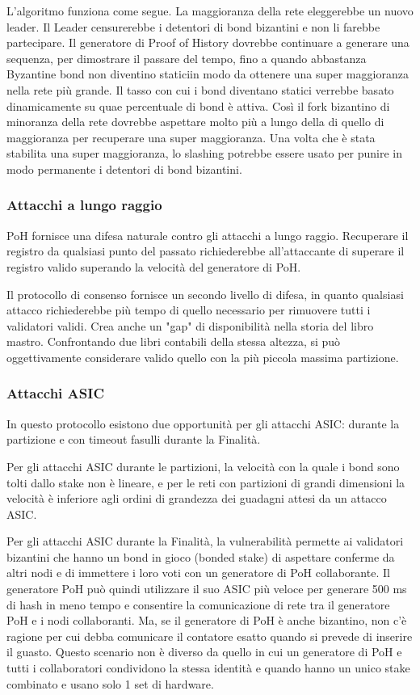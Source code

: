 \documentclass[12pt]{article}
\begin{document}
L'algoritmo funziona come segue. La maggioranza della rete eleggerebbe un nuovo leader. Il Leader censurerebbe i detentori di bond bizantini e non li farebbe partecipare. Il generatore di Proof of History dovrebbe continuare a generare una sequenza, per dimostrare il passare del tempo, fino a quando abbastanza Byzantine bond non diventino staticiin modo da ottenere una super maggioranza nella rete più grande. Il tasso con cui i bond diventano statici verrebbe basato dinamicamente su quae percentuale di bond è attiva. Così il fork bizantino di minoranza della rete dovrebbe aspettare molto più a lungo della di quello di maggioranza per recuperare una super maggioranza. Una volta che è stata stabilita una super maggioranza, lo slashing potrebbe essere usato per punire in modo permanente i detentori di bond bizantini.

\subsubsection{Attacchi a lungo raggio}\label{censorship}
PoH fornisce una difesa naturale contro gli attacchi a lungo raggio. Recuperare il registro da qualsiasi punto del passato richiederebbe all'attaccante di superare il registro valido superando la velocità del generatore di PoH.

Il protocollo di consenso fornisce un secondo livello di difesa, in quanto qualsiasi attacco richiederebbe più tempo di quello necessario per rimuovere tutti i validatori validi. Crea anche un "gap" di disponibilità nella storia del libro mastro. Confrontando due libri contabili della stessa altezza, si può oggettivamente considerare valido quello con la più piccola massima partizione.

\subsubsection{Attacchi ASIC}\label{censorship}

In questo protocollo esistono due opportunità per gli attacchi ASIC: durante la partizione e con timeout fasulli durante la Finalità.

Per gli attacchi ASIC durante le partizioni, la velocità con la quale i bond sono tolti dallo stake non è lineare, e per le reti con partizioni di grandi dimensioni la velocità è inferiore agli ordini di grandezza dei guadagni attesi da un attacco ASIC.

Per gli attacchi ASIC durante la Finalità, la vulnerabilità permette ai validatori bizantini che hanno un bond in gioco (bonded stake) di aspettare conferme da altri nodi e di immettere i loro voti con un generatore di PoH collaborante. Il generatore PoH può quindi utilizzare il suo ASIC più veloce per generare 500 ms di hash in meno tempo e consentire la comunicazione di rete tra il generatore PoH e i nodi collaboranti. Ma, se il generatore di PoH è anche bizantino, non c'è ragione per cui debba comunicare il contatore esatto quando si prevede di inserire il guasto. Questo scenario non è diverso da quello in cui un generatore di PoH e tutti i collaboratori condividono la stessa identità e quando hanno un unico stake combinato e usano solo 1 set di hardware.
\end{document}
